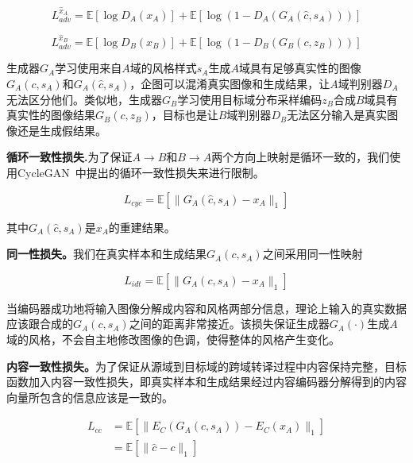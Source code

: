 \begin{equation}
\label{equ:adv_a}
L_{adv}^{\hat{x}_A} = \mathbb{E}[\log D_A(x_A)] + \mathbb{E}[\log(1-D_A(G_A(\hat{c},s_A)))]
\end{equation}

\begin{equation}
\label{equ:adv_b}
L_{adv}^{\hat{x}_B} = \mathbb{E}[\log D_B(x_B)] + \mathbb{E}[\log(1-D_B(G_B(c,z_B)))]
\end{equation}

生成器$G_A$学习使用来自$A$域的风格样式$s_A$生成$A$域具有足够真实性的图像$G_A(c,s_A)$和$G_A(\hat{c},s_A)$，企图可以混淆真实图像和生成结果，让$A$域判别器$D_A$无法区分他们。类似地，生成器$G_B$学习使用目标域分布采样编码$z_B$合成$B$域具有真实性的图像结果$G_B(c,z_B)$，目标也是让$B$域判别器$D_B$无法区分输入是真实图像还是生成假结果。

\textbf{循环一致性损失.}为了保证$A \rightarrow B$和$B \rightarrow A$两个方向上映射是循环一致的，我们使用CycleGAN~\cite{zhu2017unpaired}中提出的循环一致性损失来进行限制。

\begin{equation}
\label{equ:cycle}
L_{cyc} = \mathbb{E}[\| G_A(\hat{c}, s_A) - x_A \|_1]
\end{equation}

其中$G_A(\hat{c}, s_A)$是$x_A$的重建结果。

\textbf{同一性损失。}我们在真实样本和生成结果$G_A(c,s_A)$之间采用同一性映射

\begin{equation}
\label{equ:idt}
L_{idt} = \mathbb{E}[\| G_A(c, s_A) - x_A \|_1]
\end{equation}

当编码器成功地将输入图像分解成内容和风格两部分信息，理论上输入的真实数据应该跟合成的$G_A(c,s_A)$之间的距离非常接近。该损失保证生成器$G_A(\cdot)$生成$A$域的风格，不会自主地修改图像的色调，使得整体的风格产生变化。

\textbf{内容一致性损失。}为了保证从源域到目标域的跨域转译过程中内容保持完整，目标函数加入内容一致性损失，即真实样本和生成结果经过内容编码器分解得到的内容向量所包含的信息应该是一致的。

\begin{equation}
\label{equ:cc}
\begin{aligned}
L_{cc} & = \mathbb{E}[\| E_C(G_A(c, s_A)) - E_C(x_A) \|_1] \\
       & = \mathbb{E}[\| \hat{c} - c \|_1]
\end{aligned}
\end{equation}

